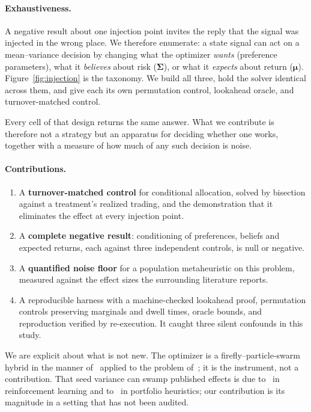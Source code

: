 \documentclass[sigconf,anonymous,review]{acmart}
\begin{document}
\paragraph{Exhaustiveness.} A negative result about one injection point invites the
reply that the signal was injected in the wrong place. We therefore enumerate: a
state signal can act on a mean--variance decision by changing what the optimizer
\emph{wants} (preference parameters), what it \emph{believes} about risk
($\boldsymbol{\Sigma}$), or what it \emph{expects} about return
($\boldsymbol{\mu}$). Figure~\ref{fig:injection} is the taxonomy. We build all
three, hold the solver identical across them, and give each its own permutation
control, lookahead oracle, and turnover-matched control.

Every cell of that design returns the same answer. What we contribute is therefore
not a strategy but an apparatus for deciding whether one works, together with a
measure of how much of any such decision is noise.

\paragraph{Contributions.}
\begin{enumerate}
\item A \textbf{turnover-matched control} for conditional allocation, solved by
bisection against a treatment's realized trading, and the demonstration that it
eliminates the effect at every injection point.
\item A \textbf{complete negative result}: conditioning of preferences, beliefs and
expected returns, each against three independent controls, is null or negative.
\item A \textbf{quantified noise floor} for a population metaheuristic on this
problem, measured against the effect sizes the surrounding literature reports.
\item A reproducible harness with a machine-checked lookahead proof, permutation
controls preserving marginals and dwell times, oracle bounds, and reproduction
verified by re-execution. It caught three silent confounds in this study.
\end{enumerate}

We are explicit about what is not new. The optimizer is a firefly--particle-swarm
hybrid in the manner of~\cite{Aydilek2018} applied to the problem
of~\cite{Bacanin2014}; it is the instrument, not a contribution. That seed variance
can swamp published effects is due to~\cite{Henderson2018} in reinforcement
learning and to~\cite{GilliSchumann2011} in portfolio heuristics; our contribution
is its magnitude in a setting that has not been audited.
\end{document}

